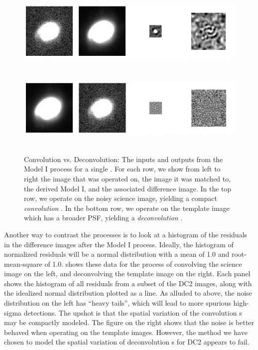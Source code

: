 \begin{figure}[htbp]
\includegraphics[height=40mm]{figures/conv_crop.jpg}
\includegraphics[height=39mm]{figures/dconv_crop.jpg}
\caption{Convolution vs. Deconvolution: The inputs and outputs
from the  Model I process for a single .
For each row, we show from left to right the image that was operated
on, the image it was matched to, the derived  Model I,
and the associated difference image.  In the top row, we operate on
the noisy science image, yielding a compact \textit{convolution}
.  In the bottom row, we operate on the template image 
which has a broader PSF, yielding a \textit{deconvolution}
.}
\label{fig-conv}
\end{figure}

Another way to contrast the processes is to look at a histogram of the
residuals in the difference images after the  Model I
process.  Ideally, the histogram of normalized residuals will be a
normal distribution with a mean of 1.0 and root-mean-square of 1.0.
 shows these data for the process of
convolving the science image on the left, and deconvolving the
template image on the right.  Each panel shows the histogram of all
 residuals from a subset of the DC2 images, along with
the idealized normal distribution plotted as a line.  As alluded to
above, the noise distribution on the left has ``heavy tails'', 
which will lead to more spurious high-sigma
detections.  The upshot is that the spatial variation of the
convolution s may be compactly modeled.  The figure on
the right shows that the noise is better behaved when operating on the
template images.  However, the method we have chosen to model the
spatial variation of deconvolution s for DC2 appears to
fail.

